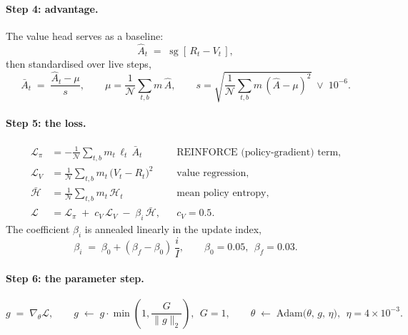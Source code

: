 \documentclass[11pt]{article}
\newcommand{\sg}{\operatorname{sg}}
\newcommand{\1}{\mathbf{1}}
\begin{document}
\paragraph{Step 4: advantage.} The value head serves as a baseline:
\begin{equation}
  \hat A_t \;=\; \sg\!\left[\, R_t - V_t \,\right],
\end{equation}
then standardised over live steps,
\begin{equation}
  \bar A_t \;=\; \frac{\hat A_t - \mu}{s},
  \qquad
  \mu = \frac{1}{\mathcal{N}}\sum_{t,b} m\,\hat A,
  \qquad
  s = \sqrt{\frac{1}{\mathcal{N}}\sum_{t,b} m\,(\hat A - \mu)^2} \;\vee\; 10^{-6}.
\end{equation}

\paragraph{Step 5: the loss.}
\begin{align}
  \mathcal{L}_{\pi} &= -\frac{1}{\mathcal{N}} \sum_{t,b} m_t\, \ell_t\, \bar A_t
    && \text{REINFORCE (policy-gradient) term,} \label{eq:lpi}\\
  \mathcal{L}_{V} &= \frac{1}{\mathcal{N}} \sum_{t,b} m_t\, \bigl(V_t - R_t\bigr)^{2}
    && \text{value regression,}\\
  \bar{\mathcal{H}} &= \frac{1}{\mathcal{N}} \sum_{t,b} m_t\, \mathcal{H}_t
    && \text{mean policy entropy,}\\[4pt]
  \mathcal{L} &= \mathcal{L}_{\pi} \;+\; c_V\,\mathcal{L}_{V} \;-\; \beta_i\, \bar{\mathcal{H}},
  && c_V = 0.5. \label{eq:loss}
\end{align}
The coefficient $\beta_i$ is annealed linearly in the update index,
\begin{equation}
  \beta_i \;=\; \beta_0 + (\beta_{\!f} - \beta_0)\,\frac{i}{I},
  \qquad \beta_0 = 0.05,\ \ \beta_{\!f} = 0.03 .
  \label{eq:beta}
\end{equation}

\paragraph{Step 6: the parameter step.}
\begin{equation}
  g \;=\; \nabla_\theta \mathcal{L},
  \qquad
  g \;\leftarrow\; g \cdot \min\!\left(1, \frac{G}{\lVert g \rVert_2}\right),\ \ G = 1,
  \qquad
  \theta \;\leftarrow\; \mathrm{Adam}\bigl(\theta,\, g,\, \eta\bigr),\ \ \eta = 4\times10^{-3}.
\end{equation}
\end{document}
